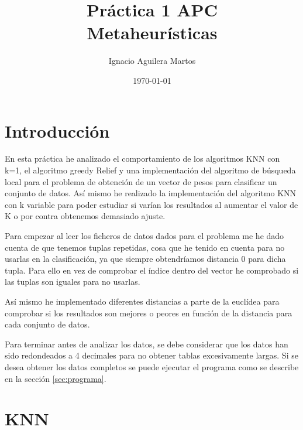 \documentclass[12pt,a4paper]{article}
\author{Ignacio Aguilera Martos}
\title{Práctica 1 APC \\ Metaheurísticas}
\date{\today}
\begin{document}
	\maketitle

	\tableofcontents

	\newpage



	\section{Introducción}
	\label{sec:introduccion}
	
	En esta práctica he analizado el comportamiento de los algoritmos KNN con k=1, el algoritmo greedy Relief y una implementación del algoritmo de búsqueda local para el problema de obtención de un vector de pesos para clasificar un conjunto de datos. Así mismo he realizado la implementación del algoritmo KNN con k variable para poder estudiar si varían los resultados al aumentar el valor de K o por contra obtenemos demasiado ajuste.
	
	Para empezar al leer los ficheros de datos dados para el problema me he dado cuenta de que tenemos tuplas repetidas, cosa que he tenido en cuenta para no usarlas en la clasificación, ya que siempre obtendríamos distancia 0 para dicha tupla. Para ello en vez de comprobar el índice dentro del vector he comprobado si las tuplas son iguales para no usarlas.
	
	Así mismo he implementado diferentes distancias a parte de la euclídea para comprobar si los resultados son mejores o peores en función de la distancia para cada conjunto de datos.
	
	Para terminar antes de analizar los datos, se debe considerar que los datos han sido redondeados a 4 decimales para no obtener tablas excesivamente largas. Si se desea obtener los datos completos se puede ejecutar el programa como se describe en la sección \hyperref[sec:programa]{\ref{sec:programa}}.

	\section{KNN}
	\label{sec:knn}
\end{document}
